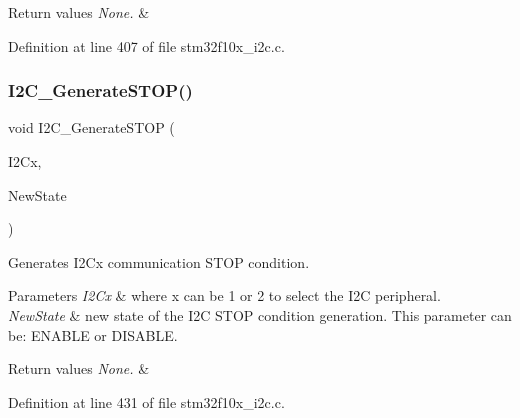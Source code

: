 \begin{DoxyRetVals}{Return values}
{\em None.} & \\
\hline
\end{DoxyRetVals}


Definition at line 407 of file stm32f10x\+\_\+i2c.\+c.

\mbox{\label{group___i2_c___private___functions_ga5c92cb573ca0ae58cc465e5400246561}} 
\subsubsection{\texorpdfstring{I2\+C\+\_\+\+Generate\+S\+T\+O\+P()}{I2C\_GenerateSTOP()}}
{\footnotesize\ttfamily void I2\+C\+\_\+\+Generate\+S\+T\+OP (\begin{DoxyParamCaption}\item[{\hyperlink{struct_i2_c___type_def}{I2\+C\+\_\+\+Type\+Def} $\ast$}]{I2\+Cx,  }\item[{\hyperlink{group___exported__types_gac9a7e9a35d2513ec15c3b537aaa4fba1}{Functional\+State}}]{New\+State }\end{DoxyParamCaption})}



Generates I2\+Cx communication S\+T\+OP condition. 


\begin{DoxyParams}{Parameters}
{\em I2\+Cx} & where x can be 1 or 2 to select the I2C peripheral. \\
\hline
{\em New\+State} & new state of the I2C S\+T\+OP condition generation. This parameter can be\+: E\+N\+A\+B\+LE or D\+I\+S\+A\+B\+LE. \\
\hline
\end{DoxyParams}

\begin{DoxyRetVals}{Return values}
{\em None.} & \\
\hline
\end{DoxyRetVals}


Definition at line 431 of file stm32f10x\+\_\+i2c.\+c.

\mbox{\label{group___i2_c___private___functions_ga15c95d0ed124f029621a2061b1677ee7}} 
